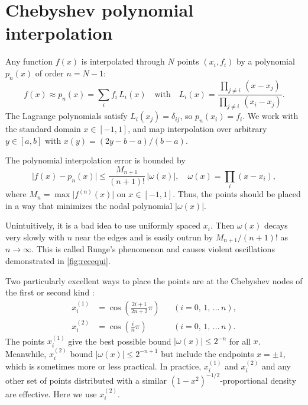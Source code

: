\documentclass{aa}
\begin{document}
\section{Chebyshev polynomial interpolation}
\label{sec:chebyshev}

Any function $f(x)$ is interpolated through $N$ points $(x_i, f_i)$ by a polynomial $p_n(x)$ of order $n=N-1$:%
\begin{equation}
	f(x) \approx p_n(x) = \sum_i f_i \, L_i(x)
	\quad \text{with} \quad
	L_i(x) = \frac{\prod_{j \neq i} \, (x-x_j)}{\prod_{j \neq i} \, (x_i-x_j)} .
\label{eq:interppoly}
\end{equation}
The Lagrange polynomials satisfy $L_i(x_j) = \delta_{ij}$, so $p_n(x_i) = f_i$.
We work with the standard domain $x \in [-1, 1]$,
and map interpolation over arbitrary $y \in [a, b]$ with $x(y) = ( 2y-b-a ) / (b-a)$.

The polynomial interpolation error is bounded by
\begin{equation}
	\big\lvert f(x) - p_n(x) \big\rvert \leq \frac{M_{n+1}}{(n+1)!} \, \lvert \omega(x) \rvert,
	\quad
	\omega(x) = \prod_i (x-x_i),
\label{eq:error}
\end{equation}
where $M_{n} = \max \lvert f^{(n)}(x) \rvert$ on $x\in[-1,1]$.
Thus, the points should be placed in a way that minimizes the nodal polynomial $\lvert \omega(x) \rvert$.

Unintuitively, it is a bad idea to use uniformly spaced $x_i$.
Then $\omega(x)$ decays very slowly with $n$ near the edges and is easily outrun by $M_{n+1}/(n+1)!$ as $n \rightarrow \infty$.
This is called Runge's phenomenon and causes violent oscillations demonstrated in \cref{fig:recequi}.

Two particularly excellent ways to place the points are at the Chebyshev nodes of the first or second kind
\citep{trefethenApproximationTheoryApproximation2019}:
\begin{subequations}
\begin{align}
	x_i^{(1)} &= \cos \left( \frac{2i+1}{2n+2} \pi \right) && (i = 0,\, 1,\, \ldots\, n), \label{eq:chebnodes1} \\
	x_i^{(2)} &= \cos \left( \frac{i}{n} \pi \right) && (i = 0,\, 1,\, \ldots\, n). \label{eq:chebnodes2}
\end{align}
\label{eq:chebnodes}%
\end{subequations}
The points $x_i^{(1)}$ give the best possible bound $\lvert \omega(x) \rvert \leq 2^{-n}$ for all $x$.
Meanwhile, $x_i^{(2)}$ bound $\lvert \omega(x) \rvert \leq 2^{-n+1}$ but include the endpoints $x = \pm 1$,
which is sometimes more or less practical.
In practice,
$x_i^{(1)}$ and $x_i^{(2)}$ and any other set of points distributed with a similar $(1-x^2)^{-1/2}$-proportional density are effective.
Here we use $x_i^{(2)}$.
\end{document}
